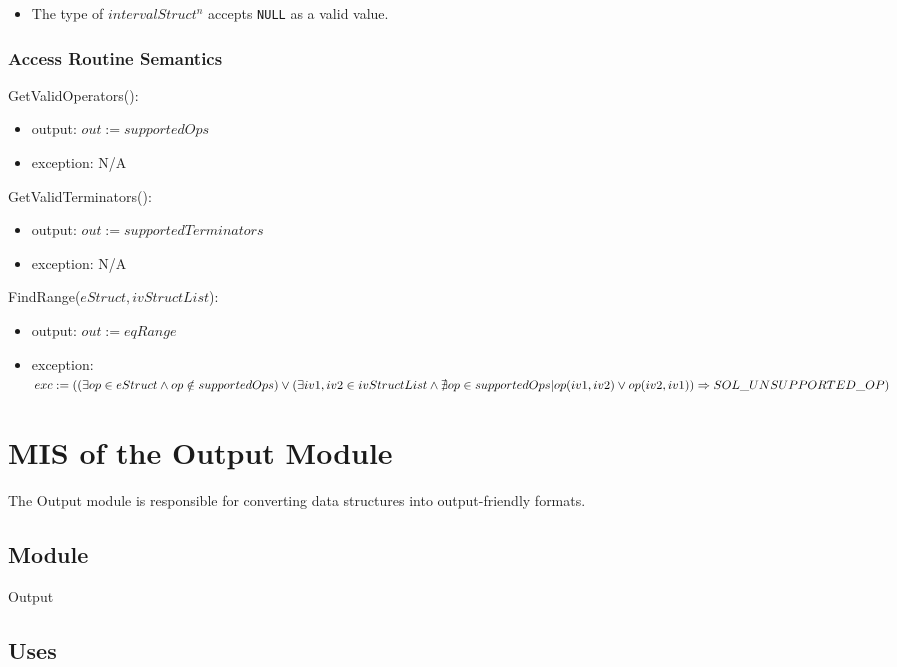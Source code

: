 \documentclass[12pt, titlepage]{article}
\begin{document}
\begin{itemize}
	\item The type of $intervalStruct^n$ accepts \texttt{NULL} as a valid value.
\end{itemize}

\subsubsection{Access Routine Semantics}

\noindent GetValidOperators():
\begin{itemize}
	\item output: $out := supportedOps$
	\item exception: N/A
\end{itemize}

\noindent GetValidTerminators():
\begin{itemize}
	\item output: $out := supportedTerminators$
	\item exception: N/A
\end{itemize}

\noindent FindRange($eStruct, ivStructList$):
\begin{itemize}
	\item output: $out := eqRange$
	\item exception: $exc := \\
	((\exists op \in eStruct \wedge op \notin supportedOps) \\
	\vee (\exists iv1, iv2 \in ivStructList \wedge \nexists op \in supportedOps 
	| op(iv1, iv2) \vee op(iv2, iv1)) \\
	\Rightarrow SOL\_UNSUPPORTED\_OP)$ 
\end{itemize}

\newpage

\section{MIS of the Output Module} 
\label{Module_output}
The Output module is responsible for converting data structures into 
output-friendly formats.

\subsection{Module}

Output

\subsection{Uses}
\end{document}
